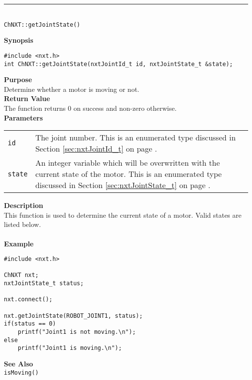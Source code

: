 \noindent
\vspace{5pt}
\rule{4.5in}{0.015in}\\
\noindent
{\LARGE \texttt{ChNXT::getJointState()}}\\
{}

\noindent
{\bf Synopsis}
\vspace{-8pt}
\begin{verbatim}
#include <nxt.h>
int ChNXT::getJointState(nxtJointId_t id, nxtJointState_t &state);
\end{verbatim}

\noindent
{\bf Purpose}\\
Determine whether a motor is moving or not.\\

\noindent
{\bf Return Value}\\
The function returns 0 on success and non-zero otherwise.\\

\noindent
{\bf Parameters}
\vspace{-0.1in}
\begin{description}
\item               
\begin{tabular}{p{10 mm}p{145 mm}}
\texttt{id} & The joint number. This is an enumerated type 
discussed in Section \ref{sec:nxtJointId_t} on page
\pageref{sec:nxtJointId_t}.\\
\texttt{state} & An integer variable which will be overwritten with the current state of the motor. 
This is an enumerated type 
discussed in Section \ref{sec:nxtJointState_t} on page
\pageref{sec:nxtJointState_t}.
\end{tabular}
\end{description}

\noindent
{\bf Description}\\
This function is used to determine the current state of a motor. Valid states are listed below.\\
\\


\noindent
{\bf Example}\\
\begin{verbatim}
#include <nxt.h>

ChNXT nxt;
nxtJointState_t status;

nxt.connect();

nxt.getJointState(ROBOT_JOINT1, status);
if(status == 0)
    printf("Joint1 is not moving.\n");
else
    printf("Joint1 is moving.\n");
\end{verbatim}

\noindent
{\bf See Also}\\
\texttt{isMoving()}\\
